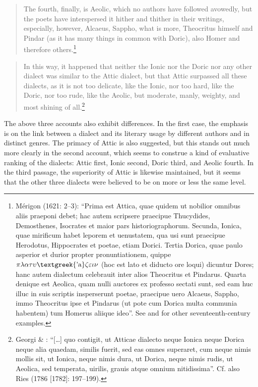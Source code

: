 \begin{quote}
The fourth, finally, is Aeolic, which no authors have followed avowedly, but the poets have interspersed it hither and thither in their writings, especially, however, Alcaeus, Sappho, what is more, Theocritus himself and Pindar (as it has many things in common with Doric), also Homer and therefore others.\footnote{Mérigon (1621: 2–3): “Prima est Attica, quae quidem ut nobilior omnibus aliis praeponi debet; hac autem scripsere praecipue Thucydides, Demosthenes, Isocrates et maior pars historiographorum. Secunda, Ionica, quae mirificum habet leporem et uenustatem, qua usi sunt praecipue Herodotus, Hippocrates et poetae, etiam Dorici. Tertia Dorica, quae paulo asperior et durior propter pronuntiationem, quippe $\pi \lambda \alpha \tau \upsilon \text{\textgreek{'a}}\zeta \varepsilon \iota \nu $ (hoc est lato et diducto ore loqui) dicuntur Dores; hanc autem dialectum celebrauit inter alios Theocritus et Pindarus. Quarta denique est Aeolica, quam nulli auctores ex professo sectati sunt, sed eam huc illuc in suis scriptis insperserunt poetae, praecipue uero Alcaeus, Sappho, immo Theocritus ipse et Pindarus (ut pote cum Dorica multa communia habentem) tum Homerus aliique ideo”. See \citet{Hoius1620} and \citet{Rhenius1626} for other seventeenth-century examples.}
\end{quote}

\begin{quote}
In this way, it happened that neither the Ionic nor the Doric nor any other dialect was similar to the Attic dialect, but that Attic surpassed all these dialects, as it is not too delicate, like the Ionic, nor too hard, like the Doric, nor too rude, like the Aeolic, but moderate, manly, weighty, and most shining of all.\footnote{Georgi \& \citet[6]{Graun1729}: “[…] quo contigit, ut Atticae dialecto neque Ionica neque Dorica neque alia quaedam, similis fuerit, sed eas omnes superaret, cum neque nimis mollis sit, ut Ionica, neque nimis dura, ut Dorica, neque nimis rudis, ut Aeolica, sed temperata, uirilis, grauis atque omnium nitidissima”. Cf. also Ries (1786 [1782]: 197–199).}
\end{quote}

The above three accounts also exhibit differences. In the first case, the emphasis is on the link between a dialect and its literary usage by different authors and in distinct genres. The primacy of Attic is also suggested, but this stands out much more clearly in the second account, which seems to construe a kind of evaluative ranking of the dialects: Attic first, Ionic second, Doric third, and Aeolic fourth. In the third passage, the superiority of Attic is likewise maintained, but it seems that the other three dialects were believed to be on more or less the same level.

